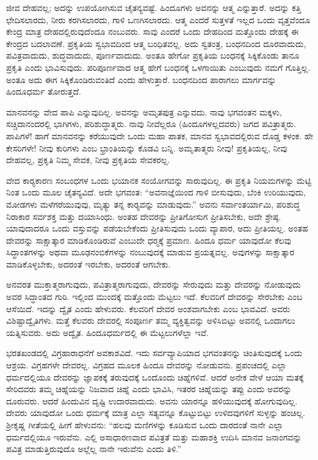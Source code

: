  ಜೀವ ದೇಹವಲ್ಲ; ಅದನ್ನು ಉಪಯೋಗಿಸುವ ಚೈತನ್ಯವಷ್ಟೆ. ಹಿಂದೂಗಳು ಅವನನ್ನು ಆತ್ಮ ಎನ್ನುತ್ತಾರೆ. ಅದನ್ನು ಕತ್ತಿ ಛೇದಿಸಲಾರದು, ನೀರು ಕರಗಿಸಲಾರದು, ಗಾಳಿ ಒಣಗಿಸಲಾರದು. ಆತ್ಮ ಎಂದರೆ ಸುತ್ತಳತೆ ಇಲ್ಲದ ಒಂದು ವೃತ್ತವೆಂದೂ ಕೇಂದ್ರ ಮಾತ್ರ ದೇಹದಲ್ಲಿರುವುದೆಂದೂ ನಂಬುವರು. ಸಾವು ಎಂದರೆ ಒಂದು ದೇಹದಿಂದ ಮತ್ತೊಂದು ದೇಹಕ್ಕೆ ಈ ಕೇಂದ್ರದ ಬದಲಾವಣೆ. ಪ್ರಕೃತಿಯ ಸ್ವಭಾವದಿಂದ ಆತ್ಮ ಬಂಧಿತವಲ್ಲ. ಅದು ಸ್ವತಂತ್ರ, ಬಂಧನದಿಂದ ದೂರವಾದುದು, ಪವಿತ್ರವಾದುದು, ಶುದ್ಧವಾದುದು, ಪೂರ್ಣವಾದುದು. ಅಂತೂ ಹೇಗೋ ಪ್ರಕೃತಿಯ ಬಂಧನಕ್ಕೆ ಸಿಕ್ಕಿಕೊಂಡು ತಾನೂ ಪ್ರಕೃತಿ ಎಂದು ಭಾವಿಸುವುದು. ಪರಿಪೂರ್ಣವಾದ ಆತ್ಮ ಹೇಗೆ ಬಂಧನಕ್ಕೆ ಒಳಗಾಯಿತು ಎಂಬುವುದು ನಮಗೆ ಗೊತ್ತಿಲ್ಲ. ಅಂತೂ ಅದು ಈಗ ಸಿಕ್ಕಿಕೊಂಡಿರುವಂತಿದೆ ಎಂದು ಹೇಳುತ್ತಾರೆ. ಬಂಧನದಿಂದ ಪಾರಾಗಲು ಮಾರ್ಗವನ್ನು ಹಿಂದೂಧರ್ಮ ತೋರುತ್ತದೆ. 

 ಮಾನವನನ್ನು ವೇದ ಪಾಪಿ ಎನ್ನುವುದಿಲ್ಲ. ಅವನನ್ನು ಅಮೃತಪುತ್ರ ಎನ್ನುವದು. ನಾವು ಭಗವಂತನ ಮಕ್ಕಳು, ಸಚ್ಚಿದಾನಂದರಲ್ಲಿ ಭಾಗಿಗಳು, ಪರಿಶುದ್ಧಾತ್ಮರು. ನಾವು ನೀವೆಲ್ಲರೂ (ಹಿಂದೂಗಳಲ್ಲದವರು) ಜಗದ ಪವಿತ್ರಾತ್ಮರು. ಪಾಪಿಗಳೆ! ಹಾಗೆ ಮಾನವನನ್ನು ಕರೆಯುವುದೇ ಒಂದು ಮಹಾ ಪಾತಕ, ಮಾನವ ಸ್ವಭಾವದಲ್ಲಿರುವ ದೊಡ್ಡ ಕಳಂಕ. ಹೇ ಕೇಸರಿಗಳೇ! ನೀವು ಕುರಿಗಳು ಎಂಬ ಭ್ರಾಂತಿಯನ್ನು ಕೊಡವಿ ಬನ್ನಿ. ಅಮೃತಾತ್ಮರು ನೀವು! ಪ್ರಕೃತಿಯಲ್ಲ, ನೀವು ದೇಹವಲ್ಲ, ಪ್ರಕೃತಿ ನಿಮ್ಮ ಸೇವಕ, ನೀವು ಪ್ರಕೃತಿಯ ಸೇವಕರಲ್ಲ. 

 ವೇದ ಕಾರ‍್ಯಕಾರಣ ಸಂಬಂಧಗಳ ಒಂದು ಭಯಾನಕ ಸಂಯೋಗವನ್ನು ಸಾರುವುದಿಲ್ಲ. ಈ ಪ್ರಕೃತಿ ನಿಯಮಗಳನ್ನು ಮೆಟ್ಟಿ ನಿಂತ ಒಂದು ಮೂಲ ಚೈತನ್ಯವಿದೆ. ಅದೇ ಭಗವಂತ: “ಅವನಾಜ್ಞೆಯಿಂದ ಗಾಳಿ ಬೀಸುವುದು, ಬೆಂಕಿ ಉರಿಯುವುದು, ಮೋಡಗಳು ಮಳೆಗರೆಯುವುವು, ಮೃತ್ಯು ತನ್ನ ಕಾರ‍್ಯವನ್ನು ಮಾಡುವುದು.” ಅವನು ಸರ್ವಾಂತರ್ಯಾಮಿ, ಪರಿಶುದ್ಧ ನಿರಾಕಾರ ಸರ್ವಶಕ್ತ ಮತ್ತು ದಯಾಸಿಂಧು. ಅಂತಹ ದೇವರನ್ನು ಪ್ರೀತಿಗೋಸುಗ ಪ್ರೀತಿಸಬೇಕು, ಅದೇ ಶ್ರೇಷ್ಠ. ಯಾವುದಾದರೂ ಒಂದು ವಸ್ತುವನ್ನು ಪಡೆಯಬೇಕೆಂದು ಪ್ರೀತಿಸುವುದು ಒಂದು ವ್ಯಾಪಾರ, ಅದು ಪ್ರೀತಿಯಲ್ಲ. ಅಂತಹ ದೇವರನ್ನು ಸಾಕ್ಷಾತ್ಕಾರ ಮಾಡಿಕೊಂಡಿರುವೆ ಎಂಬುದೇ ಧರ‍್ಮಕ್ಕೆ ಪ್ರಮಾಣ. ಹಿಂದೂ ಧರ್ಮ ಯಾವುದೋ ಕೆಲವು ಸಿದ್ಧಾಂತಗಳನ್ನು ಅಥವಾ ಮೂಢನಂಬಿಕೆಗಳನ್ನು ನಂಬುವುದಕ್ಕೆ ಮಾಡುವ ಪ್ರಯತ್ನವಲ್ಲ. ಅವುಗಳನ್ನು ಸಾಕ್ಷಾತ್ಕಾರ ಮಾಡಿಕೊಳ್ಳಬೇಕು, ಅದರಂತೆ ಇರಬೇಕು, ಅದರಂತೆ ಆಗಬೇಕು. 

 ಅನವರತ ಮುಕ್ತಾತ್ಮರಾಗುವುದು, ಪವಿತ್ರಾತ್ಮರಾಗುವುದು, ದೇವರನ್ನು ಸೇರುವುದು ಮತ್ತು ದೇವರನ್ನು ನೋಡುವುದು ಅವರ ಸಿದ್ಧಾಂತದ ಗುರಿ. ಇಲ್ಲಿಂದ ಮುಂದಕ್ಕೆ ಮತ್ತೊಂದು ಮೆಟ್ಟಲು ಇದೆ. ಕೆಲವರಿಗೆ ದೇವರನ್ನು ಸೇರಬೇಕು ಎಂಬ ಆಸೆಯಿದೆ. ಇದನ್ನು ದ್ವೈತ ಎಂದು ಹೇಳುವರು. ಕೆಲವರಿಗೆ ದೇವರ ಅಂಶವಾಗಬೇಕು ಎಂಬ ಭಾವವಿದೆ. ಅವರು ವಿಶಿಷ್ಟಾದ್ವೈತಿಗಳು. ಮತ್ತೆ ಕೆಲವರು ದೇವರಲ್ಲಿ ಸಂಪೂರ್ಣ ತಮ್ಮ ವ್ಯಕ್ತಿತ್ವವನ್ನು ಅಳಿಸಿಬಿಟ್ಟು ಅವನಲ್ಲಿ ಒಂದಾಗಲು ಯತ್ನಿಸುವರು. ಅದು ಅದ್ವೈತ. ಹಿಂದೂಧರ್ಮದಲ್ಲಿ ಈ ಮೆಟ್ಟಲುಗಳೆಲ್ಲಾ ಇವೆ. 

 ಭರತಖಂಡದಲ್ಲಿ ವಿಗ್ರಹಾರಾಧನೆಗೆ ಅವಕಾಶವಿದೆ. ಇದು ಸರ್ವವ್ಯಾಪಿಯಾದ ಭಗವಂತನನ್ನು ಚಿಂತಿಸುವುದಕ್ಕೆ ಒಂದು ಆಶ್ರಯ. ವಿಗ್ರಹಗಳೇ ದೇವರಲ್ಲ. ವಿಗ್ರಹದ ಮೂಲಕ ಹಿಂದೂ ದೇವರನ್ನು ನೋಡುವನು. ಪ್ರಪಂಚದಲ್ಲಿ ಎಲ್ಲಾ ಧರ್ಮದಲ್ಲಿಯೂ ದೇವರನ್ನು ಜ್ಞಾಪಕಕ್ಕೆ ತರುವುದಕ್ಕೆ ಒಂದೊಂದು ಚಿಹ್ನೆಗಳಿವೆ. ಆದರೆ ಅನೇಕ ವೇಳೆ ಆಯಾ ಮತಕ್ಕೆ ಸೇರಿದವರು ತಮ್ಮ ಚಿಹ್ನೆಯನ್ನು ನಿಜವಾದ ಚಿಹ್ನೆ ಎಂದು ಭಾವಿಸಿ, ಇತರರ ಚಿಹ್ನೆಯನ್ನು ತಪ್ಪು ಎಂದು ಅವರನ್ನು ದೂರುವರು. ಆದರೆ ಹಿಂದುವಿನ ದೃಷ್ಟಿ ಉದಾರವಾದುದು. ಅವನು ಯಾರನ್ನೂ ಹಳಿಯುವುದಕ್ಕೆ ಹೋಗುವುದಿಲ್ಲ. ದೇವರು ಯಾವುದೋ ಒಂದು ಧರ್ಮಕ್ಕೆ ಮಾತ್ರ ಎಲ್ಲಾ ಸತ್ಯವನ್ನೂ ಕೊಟ್ಟುಬಿಟ್ಟು ಉಳಿದವುಗಳಿಗೆ ಸುಳ್ಳನ್ನು ಹಂಚಿಲ್ಲ. ಶ‍್ರೀಕೃಷ್ಣ ಗೀತೆಯಲ್ಲಿ ಹೀಗೆ ಹೇಳುವನು: “ಹಲವು ಮಣಿಗಳನ್ನು ಕೂಡಿಸುವ ಒಂದು ದಾರದಂತೆ ನಾನೇ ಎಲ್ಲಾ ಧರ್ಮದಲ್ಲಿಯೂ ಇರುವೆನು. ಎಲ್ಲಿ ಅಸಾಧಾರಣವಾದ ಪವಿತ್ರತೆ ಮತ್ತು ಮಹಾಶಕ್ತಿ ಉದಿಸಿ ಮಾನವ ಜನಾಂಗವನ್ನು ಪವಿತ್ರ ಮಾಡುತ್ತಿರುವುದೊ ಅಲ್ಲೆಲ್ಲ ನಾನೇ ಇರುವೆನು ಎಂದು ತಿಳಿ.” 

